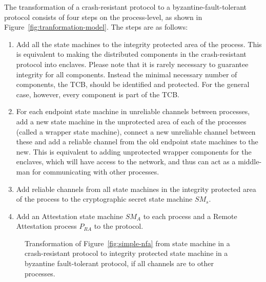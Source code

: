 \documentclass{article}
\begin{document}
	The transformation of a crash-resistant protocol to a byzantine-fault-tolerant protocol consists of four steps on the process-level, as shown in Figure~\ref{fig:tranformation-model}.
	The steps are as follows:
	\begin{enumerate}
		\item Add all the state machines to the integrity protected area of the process.
		This is equivalent to making the distributed components in the crash-resistant protocol into enclaves.
		Please note that it is rarely necessary to guarantee integrity for all components.
		Instead the minimal necessary number of components, the TCB, should be identified and protected.
		For the general case, however, every component is part of the TCB.
		\item For each endpoint state machine in unreliable channels between processes, add a new state machine in the unprotected area of each of the processes (called a wrapper state machine), connect a new unreliable channel between these and add a reliable channel from the old endpoint state machines to the new.
		This is equivalent to adding unprotected wrapper components for the enclaves, which will have access to the network, and thus can act as a middle-man for communicating with other processes.
		\item Add reliable channels from all state machines in the integrity protected area of the process to the cryptographic secret state machine $SM_s$.
		\item Add an Attestation state machine $SM_A$ to each process and a Remote Attestation process $P_{RA}$ to the protocol.
	\end{enumerate}

	\FloatBarrier
	\begin{figure}[ht]
		\center
		\caption{Transformation of Figure~\ref{fig:simple-nfa} from state machine in a crash-resistant protocol to integrity protected state machine in a byzantine fault-tolerant protocol, if all channels are to other processes.}
		\label{fig:nfa-transformation}
	\end{figure}
	\FloatBarrier
\end{document}
